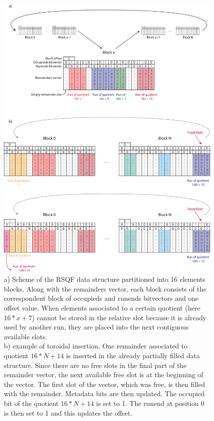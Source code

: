 \begin{figure}[h!]
	\centering
	\includegraphics[width=\linewidth]{figures/kmer_methods/cqf_toricity_export.pdf}
	\caption[The RSQF data structure scheme and toroidal property]{a) Scheme of the RSQF data structure partitioned into 16 elements blocks. Along with the remainders vector, each block consists of the correspondent block of occupieds and runends bitvectors and one offset value. When elements associated to a certain quotient (here $16*x + 7$) cannot be stored in the relative slot because it is already used by another run, they are placed into the next contiguous available slots.\\
	b) example of toroidal insertion. One remainder associated to quotient $16*N + 14$ is inserted in the already partially filled data structure. Since there are no free slots in the final part of the remainder vector, the next available free slot is at the beginning of the vector. The first slot of the vector, which was free, is then filled with the remainder. Metadata bits are then updated. The occupied bit of the quotient $16*N + 14$ is set to 1. The runend at position 0 is then set to 1 and this updates the offset.} 
	\label{fig:cqf_toricity}
\end{figure}

